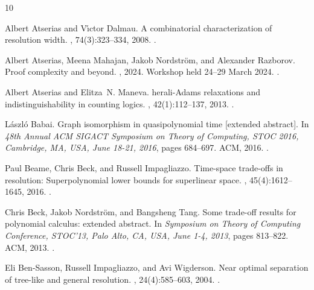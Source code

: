 \documentclass[10pt,a4paper]{article}
\begin{document}
\begin{thebibliography}{10}

Albert Atserias and V{\'{\i}}ctor Dalmau.
\newblock A combinatorial characterization of resolution width.
, 74(3):323--334, 2008.
\newblock \href {https://doi.org/10.1016/J.JCSS.2007.06.025}
  {}.

Albert Atserias, Meena Mahajan, Jakob Nordström, and Alexander Razborov.
\newblock Proof complexity and beyond.
, 2024.
\newblock Workshop held 24--29 March 2024.
\newblock \href {https://doi.org/10.14760/OWR-2024-15}
  {}.

Albert Atserias and Elitza~N. Maneva.
herali-{A}dams relaxations and indistinguishability in counting
  logics.
, 42(1):112--137, 2013.
\newblock \href {https://doi.org/10.1137/120867834}
  {}.

L{\'{a}}szl{\'{o}} Babai.
\newblock Graph isomorphism in quasipolynomial time [extended abstract].
\newblock In {\em 48th Annual {ACM} {SIGACT} Symposium on Theory of Computing,
  {STOC} 2016, Cambridge, MA, USA, June 18-21, 2016}, pages 684--697. {ACM},
  2016.
\newblock \href {https://doi.org/10.1145/2897518.2897542}
  {}.

Paul Beame, Chris Beck, and Russell Impagliazzo.
\newblock Time-space trade-offs in resolution: Superpolynomial lower bounds for
  superlinear space.
, 45(4):1612--1645, 2016.
\newblock \href {https://doi.org/10.1137/130914085}
  {}.

Chris Beck, Jakob Nordstr{\"{o}}m, and Bangsheng Tang.
\newblock Some trade-off results for polynomial calculus: extended abstract.
\newblock In {\em Symposium on Theory of Computing Conference, STOC'13, Palo
  Alto, CA, USA, June 1-4, 2013}, pages 813--822. {ACM}, 2013.
\newblock \href {https://doi.org/10.1145/2488608.2488711}
  {}.

Eli Ben{-}Sasson, Russell Impagliazzo, and Avi Wigderson.
\newblock Near optimal separation of tree-like and general resolution.
, 24(4):585--603, 2004.
\newblock \href {https://doi.org/10.1007/S00493-004-0036-5}
  {}.


\end{thebibliography}
\end{document}

